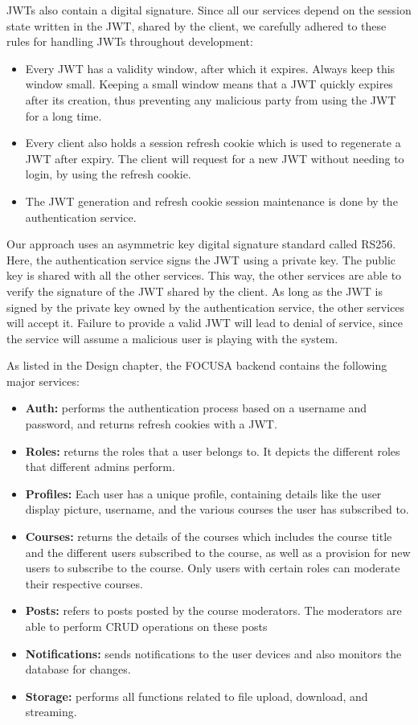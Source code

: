 JWTs also contain a digital signature. Since all our services depend on the session state 
written in the JWT, shared by the client, we carefully adhered to these rules for handling 
JWTs throughout development:

\begin{itemize}
    \item Every JWT has a validity window, after which it expires. Always keep this window small. 
    Keeping a small window means that a JWT quickly expires after its creation, thus preventing 
    any malicious party from using the JWT for a long time.
    \item Every client also holds a session refresh cookie which is used to regenerate a JWT
    after expiry. The client will request for a new JWT without needing to login, by using the 
    refresh cookie.
    \item The JWT generation and refresh cookie session maintenance is done by the authentication 
    service.
\end{itemize}

Our approach uses an asymmetric key digital signature standard called RS256. Here, the authentication 
service signs the JWT using a private key. The public key is shared with all the other services. This 
way, the other services are able to verify the signature of the JWT shared by the client. As long as the 
JWT is signed by the private key owned by the authentication service, the other services will accept it. 
Failure to provide a valid JWT will lead to denial of service, since the service will assume a malicious 
user is playing with the system.

As listed in the Design chapter, the FOCUSA backend contains the following major services:
\begin{itemize}
    \item \textbf{Auth:} performs the authentication process based on a username and password, and returns refresh cookies with a JWT.
    \item \textbf{Roles:}  returns the roles that a user belongs to. It depicts the different roles that different admins perform.
    \item \textbf{Profiles:} Each user has a unique profile, containing details like the user display picture, username, and the various courses the user has subscribed to.
    \item \textbf{Courses:}  returns the details of the courses which includes the course title and the different users subscribed to the course, as well as a provision for new users to subscribe to the course. Only users with certain roles can moderate their respective courses.
    \item \textbf{Posts:} refers to posts posted by the course moderators. The moderators are able to perform CRUD operations on these posts
    \item \textbf{Notifications:}  sends notifications to the user devices and also monitors the database for changes.
    \item \textbf{Storage:} performs all functions related to file upload, download, and streaming.
\end{itemize}

